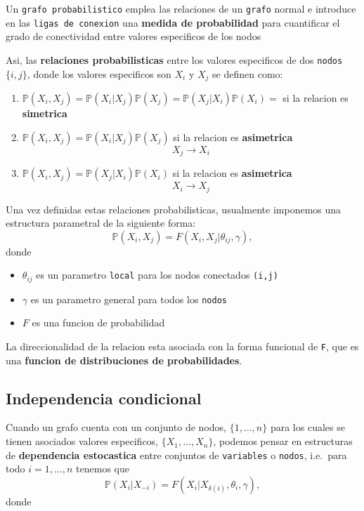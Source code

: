 \documentclass[11pt,]{article}
\begin{document}
Un \texttt{grafo\ probabilistico} emplea las relaciones de un
\texttt{grafo} normal e introduce en las \texttt{ligas\ de\ conexion}
una \textbf{medida de probabilidad} para cuantificar el grado de
conectividad entre valores especificos de los nodos

Asi, las \textbf{relaciones probabilisticas} entre los valores
especificos de dos \texttt{nodos} \(\{i,j\}\), donde los valores
especificos son \(X_i\) y \(X_j\) se definen como:

\begin{enumerate}
\def\labelenumi{\alph{enumi}.}
\item
  \(\mathbb{P}(X_i,X_j)=\mathbb{P}(X_i|X_j)\mathbb{P}(X_j)=\mathbb{P}(X_j|X_i)\mathbb{P}(X_i)=\)
  si la relacion es \textbf{simetrica}
\item
  \(\mathbb{P}(X_i,X_j)=\mathbb{P}(X_i|X_j)\mathbb{P}(X_j)\) si la
  relacion es \textbf{asimetrica} \[X_j \rightarrow X_i\]
\item
  \(\mathbb{P}(X_i,X_j)=\mathbb{P}(X_j|X_i)\mathbb{P}(X_i)\) si la
  relacion es \textbf{asimetrica} \[X_i \rightarrow X_j\]
\end{enumerate}

Una vez definidas estas relaciones probabilisticas, usualmente imponemos
una estructura parametral de la siguiente forma:
\[\mathbb{P}(X_i,X_j)=F(X_i,X_j|\theta_{ij},\gamma),\] donde

\begin{itemize}
\item
  \(\theta_{ij}\) es un parametro \texttt{local} para los nodos
  conectados \texttt{(i,j)}
\item
  \(\gamma\) es un parametro general para todos los \texttt{nodos}
\item
  \(F\) es una funcion de probabilidad
\end{itemize}

La direccionalidad de la relacion esta asociada con la forma funcional
de \texttt{F}, que es una \textbf{funcion de distribuciones de
probabilidades}.

\subsection{Independencia condicional}\label{independencia-condicional}

Cuando un grafo cuenta con un conjunto de nodos, \(\{1,\ldots,n\}\) para
los cuales se tienen asociados valores especificos,
\(\{X_1,\ldots,X_n\}\), podemos pensar en estructuras de
\textbf{dependencia estocastica} entre conjuntos de \texttt{variables} o
\texttt{nodos}, i.e.~para todo \(i=1,\ldots,n\) tenemos que
\[\mathbb{P}(X_i|X_{-i})=F(X_i|X_{\delta(i)},\theta_i,\gamma),\] donde
\end{document}
